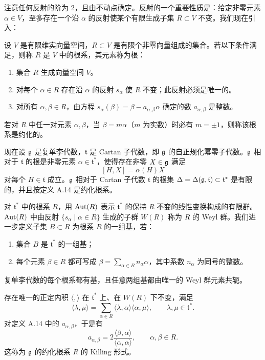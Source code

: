 注意任何反射的阶为 2，且由不动点确定。反射的一个重要性质是：给定非零元素 $\alpha\in V$，至多存在一个沿 $\alpha$ 的反射使某个有限生成子集 $R\subset V$ 不变。我们现在引入：

\begin{definition}[A.14] 设 $V$ 是有限维实向量空间，$R\subset V$ 是有限个非零向量组成的集合。若以下条件满足，则称 $R$ 是 $V$ 中的根系，其元素称为根：

\begin{enumerate}
\item 集合 $R$ 生成向量空间 $V$。
\item 对每个 $\alpha\in R$ 存在沿 $\alpha$ 的反射 $s_\alpha$ 使 $R$ 不变；此反射必须是唯一的。
\item 对所有 $\alpha,\beta\in R$，由方程 $s_\alpha(\beta)=\beta-a_{\alpha,\beta}\alpha$ 确定的数 $a_{\alpha,\beta}$ 是整数。
\end{enumerate}
\end{definition}

若对 $R$ 中任一对元素 $\alpha,\beta$，当 $\beta=m\alpha$（$m$ 为实数）时必有 $m=\pm1$，则称该根系是约化的。

现在设 $\mathfrak{g}$ 是复单李代数，$\mathfrak{t}$ 是 Cartan 子代数，即 $\mathfrak{g}$ 的自正规化幂零子代数。$\mathfrak{g}$ 相对于 $\mathfrak{t}$ 的根是非零元素 $\alpha\in\mathfrak{t}^{*}$，使得存在非零 $X\in\mathfrak{g}$ 满足
\[
[H,X]=\alpha(H)X
\]
对每个 $H\in\mathfrak{t}$ 成立。$\mathfrak{g}$ 相对于 Cartan 子代数 $\mathfrak{t}$ 的根集 $\Delta=\Delta(\mathfrak{g},\mathfrak{t})\subset\mathfrak{t}^{*}$ 是有限的，并且按定义 A.14 是约化根系。

对 $\mathfrak{t}^{*}$ 中的根系 $R$，用 $\operatorname{Aut}(R)$ 表示 $\mathfrak{t}^{*}$ 的保持 $R$ 不变的线性变换构成的有限群。$\operatorname{Aut}(R)$ 中由反射 $\{s_\alpha\mid\alpha\in R\}$ 生成的子群 $W(R)$ 称为 $R$ 的 Weyl 群。我们进一步定义子集 $B\subset R$ 为根系 $R$ 的一组基，若：
\begin{enumerate}
\item 集合 $B$ 是 $\mathfrak{t}^{*}$ 的一组基；
\item 每个元素 $\beta\in R$ 都可写成 $\beta=\sum_{\alpha\in B}n_\alpha\alpha$，其中系数 $n_\alpha$ 为同号的整数。
\end{enumerate}
复单李代数的每个根系都有基，且任意两组基都由唯一的 Weyl 群元素共轭。

存在唯一的正定内积 $\langle,\rangle$ 在 $\mathfrak{t}^{*}$ 上、在 $W(R)$ 下不变，满足
\[
\langle\lambda,\mu\rangle=\sum_{\alpha\in R}\langle\lambda,\alpha\rangle\langle\alpha,\mu\rangle,
\qquad\lambda,\mu\in\mathfrak{t}^{*}.
\]
对定义 A.14 中的 $a_{\alpha,\beta}$，于是有
\[
a_{\alpha,\beta}=2\frac{\langle\beta,\alpha\rangle}{\langle\alpha,\alpha\rangle},
\qquad\alpha,\beta\in R.
\]
这称为 $\mathfrak{g}$ 的约化根系 $R$ 的 Killing 形式。

